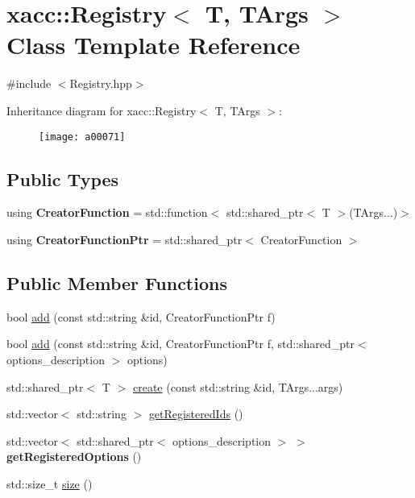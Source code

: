 \hypertarget{a00071}{}\section{xacc\+:\+:Registry$<$ T, T\+Args $>$ Class Template Reference}
\label{a00071}


{\ttfamily \#include $<$Registry.\+hpp$>$}

Inheritance diagram for xacc\+:\+:Registry$<$ T, T\+Args $>$\+:\begin{figure}[H]
\begin{center}
\leavevmode
\texttt{[image: a00071]}
\end{center}
\end{figure}
\subsection*{Public Types}
\begin{DoxyCompactItemize}
\item 
using {\bfseries Creator\+Function} = std\+::function$<$ std\+::shared\+\_\+ptr$<$ T $>$(T\+Args...)$>$\hypertarget{a00071_a784134d683dee924996e12d32a6da16c}{}\label{a00071_a784134d683dee924996e12d32a6da16c}

\item 
using {\bfseries Creator\+Function\+Ptr} = std\+::shared\+\_\+ptr$<$ Creator\+Function $>$\hypertarget{a00071_a2e7d22d66dcc4644e01bcc398a3e23cc}{}\label{a00071_a2e7d22d66dcc4644e01bcc398a3e23cc}

\end{DoxyCompactItemize}
\subsection*{Public Member Functions}
\begin{DoxyCompactItemize}
\item 
bool \hyperlink{a00071_a5ec7144ddc944674313badd32452fecc}{add} (const std\+::string \&id, Creator\+Function\+Ptr f)
\item 
bool \hyperlink{a00071_a51d98b5cf6e2722655a2f597b436aa80}{add} (const std\+::string \&id, Creator\+Function\+Ptr f, std\+::shared\+\_\+ptr$<$ options\+\_\+description $>$ options)
\item 
std\+::shared\+\_\+ptr$<$ T $>$ \hyperlink{a00071_aecccbd5534276cbdd1553e43c942219b}{create} (const std\+::string \&id, T\+Args...\+args)
\item 
std\+::vector$<$ std\+::string $>$ \hyperlink{a00071_a8bff6f5c50534375abc4026662d69d2e}{get\+Registered\+Ids} ()
\item 
std\+::vector$<$ std\+::shared\+\_\+ptr$<$ options\+\_\+description $>$ $>$ {\bfseries get\+Registered\+Options} ()\hypertarget{a00071_ad1fef83142cd38d0727471c15507a0ea}{}\label{a00071_ad1fef83142cd38d0727471c15507a0ea}

\item 
std\+::size\+\_\+t \hyperlink{a00071_a2352dd7c6c85ae5c5e232b577dfa2544}{size} ()
\end{DoxyCompactItemize}
